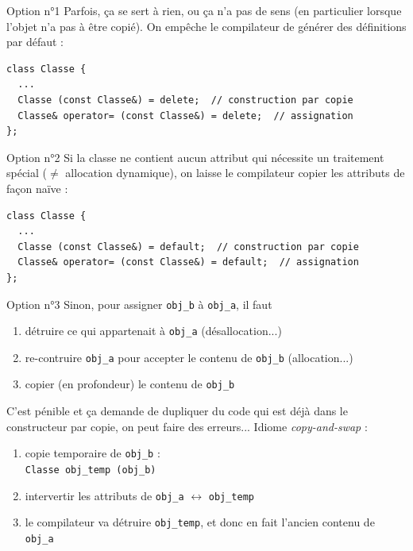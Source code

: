 \documentclass[c]{beamer}
\newcommand{\inline}[1]{\texttt{#1}}
\begin{document}

\begin{frame}[fragile]{Option n°1}
Parfois, ça se sert à rien, ou ça n'a pas de sens (en particulier lorsque l'objet n'a pas à être copié). On empêche le compilateur de générer des définitions par défaut :\\
\begin{verbatim}
class Classe {
  ...
  Classe (const Classe&) = delete;  // construction par copie
  Classe& operator= (const Classe&) = delete;  // assignation
};
\end{verbatim}
\end{frame}


\begin{frame}[fragile]{Option n°2}
Si la classe ne contient aucun attribut qui nécessite un traitement spécial ($\neq$ allocation dynamique), on laisse le compilateur copier les attributs de façon naïve :\\
\begin{verbatim}
class Classe {
  ...
  Classe (const Classe&) = default;  // construction par copie
  Classe& operator= (const Classe&) = default;  // assignation
};
\end{verbatim}
\end{frame}


\begin{frame}[fragile]{Option n°3}
Sinon, pour assigner \inline{obj_b} à \inline{obj_a}, il faut
\begin{enumerate}
  \item détruire ce qui appartenait à \inline{obj_a} (désallocation...)
  \item re-contruire \inline{obj_a} pour accepter le contenu de \inline{obj_b} (allocation...)
  \item copier (en profondeur) le contenu de \inline{obj_b}
\end{enumerate}
\vspace{1em}
\pause
C'est pénible et ça demande de dupliquer du code qui est déjà dans le constructeur par copie, on peut faire des erreurs... Idiome \emph{copy-and-swap} :
\begin{enumerate}[<+->]
  \item copie temporaire de \inline{obj_b} :\\ \inline{Classe obj_temp (obj_b)}
  \item intervertir les attributs de \inline{obj_a} $\leftrightarrow$ \inline{obj_temp}
  \item le compilateur va détruire \inline{obj_temp}, et donc en fait l'ancien contenu de \inline{obj_a}
\end{enumerate}
\end{frame}
\end{document}
